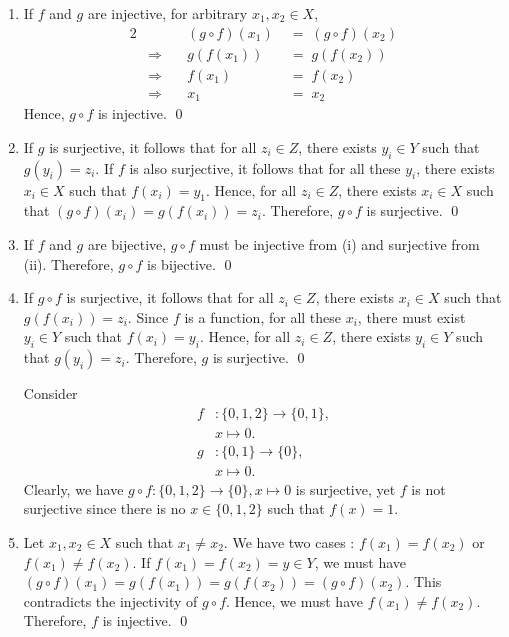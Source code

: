 \documentclass[10pt]{article}
\begin{document}
	\begin{enumerate}
		\item If $f$ and $g$ are injective, for arbitrary $x_1, x_2 \in X$,
		\begin{alignat*}{2}
			&&(g\circ f)(x_1) \;&=\; (g \circ f)(x_2) \\
			&\Rightarrow\quad& g(f(x_1)) \;&=\; g(f(x_2)) \\
			&\Rightarrow\quad& f(x_1) \;&=\; f(x_2) \tag{Injectivity of $g$}\\
			&\Rightarrow\quad& x_1 \;&=\; x_2 \tag{Injectivity of $f$}
		\end{alignat*}
		Hence, $g\circ f$ is injective. \qed
		
		\item If $g$ is surjective, it follows that for all $z_i \in Z$, there exists $y_i \in Y$ such that
		$g(y_i) = z_i$. If $f$ is also surjective, it follows that for all these $y_i$, there exists $x_i \in X$ such that
		$f(x_i) = y_1$. Hence, for all $z_i \in Z$, there exists $x_i \in X$ such that $(g\circ f)(x_i) = g(f(x_i)) = z_i$.
		Therefore, $g\circ f$ is surjective. \qed
		
		\item If $f$ and $g$ are bijective, $g\circ f$ must be injective from (i) and surjective from (ii).
		Therefore, $g\circ f$ is bijective. \qed
		
		\item If $g\circ f$ is surjective, it follows that for all $z_i \in Z$, there exists $x_i \in X$ such that
		$g(f(x_i)) = z_i$. Since $f$ is a function, for all these $x_i$, there must exist $y_i \in Y$ such that
		$f(x_i) = y_i$. Hence, for all $z_i \in Z$, there exists $y_i \in Y$ such that $g(y_i) = z_i$.
		Therefore, $g$ is surjective. \qed
		
		Consider
		\begin{align*}
			f &: \{0, 1, 2\}  \to \{0, 1\},\\
			&x \mapsto 0.\\
			g &: \{0, 1\} \to \{0\},\\
			&x \mapsto 0.
		\end{align*}
		Clearly, we have $g\circ f: \{0, 1, 2\} \to \{0\}, x\mapsto 0$ is surjective, yet $f$ is not surjective since 
		there is no $x \in \{0, 1, 2\}$ such that $f(x) = 1$.
		
		\item Let $x_1, x_2 \in X$ such that $x_1 \neq x_2$. We have two cases : $f(x_1) = f(x_2)$ or $f(x_1) \neq f(x_2)$.
		If $f(x_1) = f(x_2) = y \in Y$, we must have $(g\circ f)(x_1) = g(f(x_1)) = g(f(x_2)) = (g\circ f)(x_2)$.
		This contradicts the injectivity of $g\circ f$. Hence, we must have $f(x_1) \neq f(x_2)$.
		Therefore, $f$ is injective. \qed
		

\end{enumerate}
\end{document}
